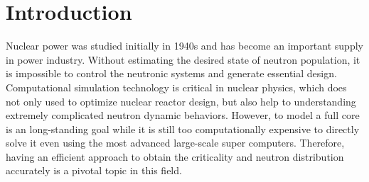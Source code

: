 
\cleardoublepage


\chapter{Introduction}
\label{chapter:intro}
Nuclear power was studied initially in 1940s and has become an important supply in power industry.
Without estimating the desired state of neutron population, it is impossible to control the neutronic systems and generate essential design. 
Computational simulation technology is critical in nuclear physics, which does not only used to optimize nuclear reactor design, but also help to understanding extremely complicated neutron dynamic behaviors.
However, to model a full core is an long-standing goal while it is still too computationally expensive to directly solve it even using the most advanced large-scale super computers. 
Therefore, having an efficient approach to obtain the criticality and neutron distribution accurately is a pivotal topic in this field.

